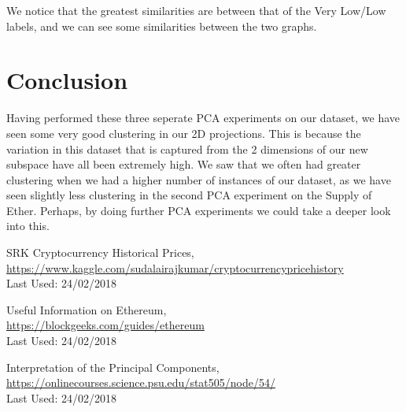 \documentclass{article}
\begin{document}
We notice that the greatest similarities are between that of the Very Low/Low labels, and we can see some similarities between the two graphs. 

\section{Conclusion}
Having performed these three seperate PCA experiments on our dataset, we have seen some very good clustering in our 2D projections. This is because the variation in this dataset that is captured from the 2 dimensions of our new subspace have all been extremely high. We saw that we often had greater clustering when we had a higher number of instances of our dataset, as we have seen slightly less clustering in the second PCA experiment on the Supply of Ether. Perhaps, by doing further PCA experiments we could take a deeper look into this.

\begin{thebibliography}{9}
SRK 
Cryptocurrency Historical Prices,
\\\url{https://www.kaggle.com/sudalairajkumar/cryptocurrencypricehistory}
\\Last Used: 24/02/2018
 
Useful Information on Ethereum,
\\\url{https://blockgeeks.com/guides/ethereum}
\\Last Used: 24/02/2018

Interpretation of the Principal Components,
\\\url{https://onlinecourses.science.psu.edu/stat505/node/54/}
\\Last Used: 24/02/2018


\end{thebibliography}
\end{document}
